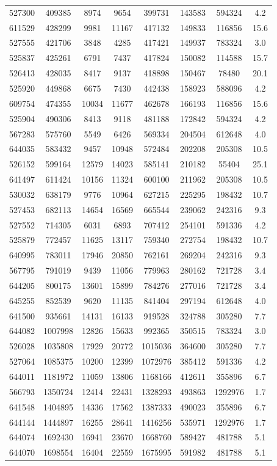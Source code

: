 \documentclass[DM,lsstdraft,toc,usenatbib]{lsstdoc}
\begin{document}
\begin{table}
\begin{tabular}{cccccccc}
527300 & 409385 & 8974 & 9654 & 399731 & 143583 & 594324 & 4.2 \\
611529 & 428299 & 9981 & 11167 & 417132 & 149833 & 116856 & 15.6 \\
527555 & 421706 & 3848 & 4285 & 417421 & 149937 & 783324 & 3.0 \\
525837 & 425261 & 6791 & 7437 & 417824 & 150082 & 114588 & 15.7 \\
526413 & 428035 & 8417 & 9137 & 418898 & 150467 & 78480 & 20.1 \\
525920 & 449868 & 6675 & 7430 & 442438 & 158923 & 588096 & 4.2 \\
609754 & 474355 & 10034 & 11677 & 462678 & 166193 & 116856 & 15.6 \\
525904 & 490306 & 8413 & 9118 & 481188 & 172842 & 594324 & 4.2 \\
567283 & 575760 & 5549 & 6426 & 569334 & 204504 & 612648 & 4.0 \\
644035 & 583432 & 9457 & 10948 & 572484 & 202208 & 205308 & 10.5 \\
526152 & 599164 & 12579 & 14023 & 585141 & 210182 & 55404 & 25.1 \\
641497 & 611424 & 10156 & 11324 & 600100 & 211962 & 205308 & 10.5 \\
530032 & 638179 & 9776 & 10964 & 627215 & 225295 & 198432 & 10.7 \\
527453 & 682113 & 14654 & 16569 & 665544 & 239062 & 242316 & 9.3 \\
527552 & 714305 & 6031 & 6893 & 707412 & 254101 & 591336 & 4.2 \\
525879 & 772457 & 11625 & 13117 & 759340 & 272754 & 198432 & 10.7 \\
640995 & 783011 & 17946 & 20850 & 762161 & 269204 & 242316 & 9.3 \\
567795 & 791019 & 9439 & 11056 & 779963 & 280162 & 721728 & 3.4 \\
644205 & 800175 & 13601 & 15899 & 784276 & 277016 & 721728 & 3.4 \\
645255 & 852539 & 9620 & 11135 & 841404 & 297194 & 612648 & 4.0 \\
641500 & 935661 & 14131 & 16133 & 919528 & 324788 & 305280 & 7.7 \\
644082 & 1007998 & 12826 & 15633 & 992365 & 350515 & 783324 & 3.0 \\
526028 & 1035808 & 17929 & 20772 & 1015036 & 364600 & 305280 & 7.7 \\
527064 & 1085375 & 10200 & 12399 & 1072976 & 385412 & 591336 & 4.2 \\
644011 & 1181972 & 11059 & 13806 & 1168166 & 412611 & 355896 & 6.7 \\
566793 & 1350724 & 12414 & 22431 & 1328293 & 493863 & 1292976 & 1.7 \\
641548 & 1404895 & 14336 & 17562 & 1387333 & 490023 & 355896 & 6.7 \\
644144 & 1444897 & 16255 & 28641 & 1416256 & 535971 & 1292976 & 1.7 \\
644074 & 1692430 & 16941 & 23670 & 1668760 & 589427 & 481788 & 5.1 \\
644070 & 1698554 & 16404 & 22559 & 1675995 & 591982 & 481788 & 5.1 \\


\end{tabular}
\end{table}
\end{document}
